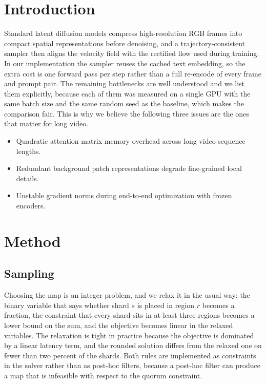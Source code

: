 \documentclass[10pt,twocolumn,letterpaper]{article}
\begin{document}

\section{Introduction}

Standard latent diffusion models compress high-resolution RGB frames into compact spatial
representations before denoising, and a trajectory-consistent sampler then aligns the
velocity field with the rectified flow used during training. In our implementation the
sampler reuses the cached text embedding, so the extra cost is one forward pass per step
rather than a full re-encode of every frame and prompt pair. The remaining bottlenecks
are well understood and we list them explicitly, because each of them was measured on a
single GPU with the same batch size and the same random seed as the baseline, which makes
the comparison fair. This is why we believe the following three issues are the ones that
matter for long video.

\begin{itemize}
\item Quadratic attention matrix memory overhead across long video sequence lengths.
\item Redundant background patch representations degrade fine-grained local details.
\item Unstable gradient norms during end-to-end optimization with frozen encoders.
\end{itemize}

\section{Method}

\subsection{Sampling}
\noindent Choosing the map is an integer problem, and we relax it in the usual way: the
binary variable that says whether shard $s$ is placed in region $r$ becomes a fraction,
the constraint that every shard sits in at least three regions becomes a lower bound on
the sum, and the objective becomes linear in the relaxed variables. The relaxation is
tight in practice because the objective is dominated by a linear latency term, and the
rounded solution differs from the relaxed one on fewer than two percent of the shards.
Both rules are implemented as constraints in the solver rather than as post-hoc filters,
because a post-hoc filter can produce a map that is infeasible with respect to the
quorum constraint.
\end{document}
